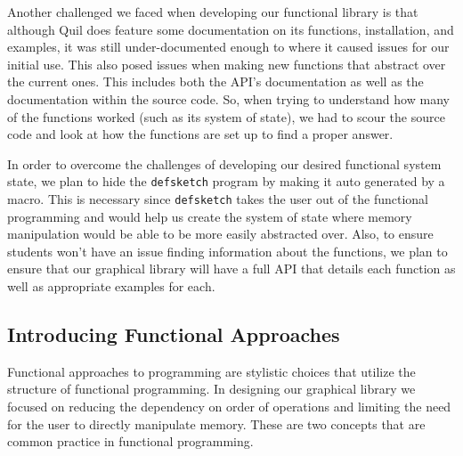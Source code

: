 \documentclass[12pt]{article}
\newcommand{\comment}[1]{{\bf \tt  {#1}}}
\newcommand{\todo}[1]{\textcolor{blue}{\comment{To Do: {#1}}}}
\begin{document}
Another challenged we faced when developing our functional library is that although Quil does feature some documentation on its functions, installation, and examples, it was still under-documented enough to where it caused issues for our initial use. This also posed issues when making new functions that abstract over the current ones. This includes both the API’s documentation as well as the documentation within the source code. So, when trying to understand how many of the functions worked (such as its system of state), we had to scour the source code and look at how the functions are set up to find a proper answer. 

In order to overcome the challenges of developing our desired functional system state, we plan to hide the \texttt{defsketch} program by making it auto generated by a macro. This is necessary since \texttt{defsketch} takes the user out of the functional programming and would help us create the system of state where memory manipulation would be able to be more easily abstracted over. Also, to ensure students won’t have an issue finding information about the functions, we plan to ensure that our graphical library will have a full API that details each function as well as appropriate examples for each. 

\subsection{Introducing Functional Approaches}\label{subsec:functional}
Functional approaches to programming are stylistic choices that utilize the structure of functional programming. In designing our graphical library we focused on reducing the dependency on order of operations and limiting the need for the user to directly manipulate memory. These are two concepts that are common practice in functional programming.
\end{document}

